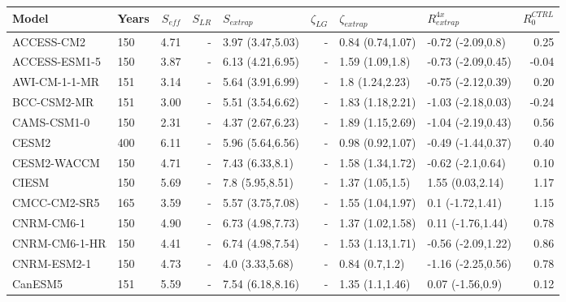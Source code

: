 \documentclass[esd, article]{copernicus}
\begin{document}
\begin{table}[t]
\small
\begin{tabular}{llrrlrllr}
\toprule
       Model & Years &  $S_{eff}$ &  $S_{LR}$ &       $S_{extrap}$ & $\zeta_{LG}$ &   $\zeta_{extrap}$ &    $R^{4x}_{extrap}$ & $R^{CTRL}_0$ \\
\midrule
      ACCESS-CM2 &   150 &       4.71 &         - &  3.97 (3.47,5.03) &       - &  0.84 (0.74,1.07) &   -0.72 (-2.09,0.8) &         0.25 \\
   ACCESS-ESM1-5 &   150 &       3.87 &         - &  6.13 (4.21,6.95) &       - &   1.59 (1.09,1.8) &  -0.73 (-2.09,0.45) &        -0.04 \\
   AWI-CM-1-1-MR &   151 &       3.14 &         - &  5.64 (3.91,6.99) &       - &   1.8 (1.24,2.23) &  -0.75 (-2.12,0.39) &         0.20 \\
     BCC-CSM2-MR &   151 &       3.00 &         - &  5.51 (3.54,6.62) &       - &  1.83 (1.18,2.21) &  -1.03 (-2.18,0.03) &        -0.24 \\
     CAMS-CSM1-0 &   150 &       2.31 &         - &  4.37 (2.67,6.23) &       - &  1.89 (1.15,2.69) &  -1.04 (-2.19,0.43) &         0.56 \\
           CESM2 &   400 &       6.11 &         - &  5.96 (5.64,6.56) &       - &  0.98 (0.92,1.07) &  -0.49 (-1.44,0.37) &         0.40 \\
     CESM2-WACCM &   150 &       4.71 &         - &   7.43 (6.33,8.1) &       - &  1.58 (1.34,1.72) &   -0.62 (-2.1,0.64) &         0.10 \\
           CIESM &   150 &       5.69 &         - &   7.8 (5.95,8.51) &       - &   1.37 (1.05,1.5) &    1.55 (0.03,2.14) &         1.17 \\
    CMCC-CM2-SR5 &   165 &       3.59 &         - &  5.57 (3.75,7.08) &       - &  1.55 (1.04,1.97) &    0.1 (-1.72,1.41) &         1.15 \\
      CNRM-CM6-1 &   150 &       4.90 &         - &  6.73 (4.98,7.73) &       - &  1.37 (1.02,1.58) &   0.11 (-1.76,1.44) &         0.78 \\
   CNRM-CM6-1-HR &   150 &       4.41 &         - &  6.74 (4.98,7.54) &       - &  1.53 (1.13,1.71) &  -0.56 (-2.09,1.22) &         0.86 \\
     CNRM-ESM2-1 &   150 &       4.73 &         - &   4.0 (3.33,5.68) &       - &    0.84 (0.7,1.2) &  -1.16 (-2.25,0.56) &         0.78 \\
         CanESM5 &   151 &       5.59 &         - &  7.54 (6.18,8.16) &       - &   1.35 (1.1,1.46) &    0.07 (-1.56,0.9) &         0.12 \\

\end{tabular}
\end{table}
\end{document}
